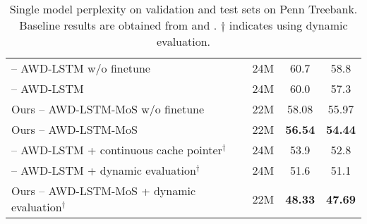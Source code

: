 \begin{table*}[t]
\begin{tabular}{l|ccc}
		\midrule
		\citet{merity2017regularizing} -- AWD-LSTM w/o finetune & 24M & 60.7 & 58.8 \\
		\citet{merity2017regularizing} -- AWD-LSTM & 24M & 60.0 & 57.3 \\
		Ours -- AWD-LSTM-MoS w/o finetune & 22M & 58.08 & 55.97 \\
		Ours -- AWD-LSTM-MoS & 22M & \textbf{56.54} & \textbf{54.44} \\
		\midrule
		\citet{merity2017regularizing} -- AWD-LSTM + continuous cache pointer$^\dagger$ & 24M & 53.9 & 52.8 \\
		\citet{krause2017dynamic} -- AWD-LSTM + dynamic evaluation$^\dagger$ & 24M & 51.6 & 51.1 \\
		Ours -- AWD-LSTM-MoS + dynamic evaluation$^\dagger$ & 22M & \textbf{48.33} & \textbf{47.69} \\
		\bottomrule
	\end{tabular}
	\caption{\small
		Single model perplexity on validation and test sets on Penn Treebank. Baseline results are obtained from \citet{merity2017regularizing} and \citet{krause2017dynamic}. $\dagger$ indicates using dynamic evaluation.
	}
	\label{table:PTB}
\end{table*}

